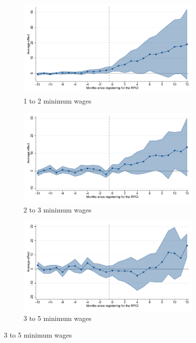 \begin{figure}[H]
    \begin{subfigure}{0.32\textwidth}
    \caption{1 to 2 minimum wages}
    \includegraphics[width=\textwidth]{04_Figures/muestra_10porciento/event_study_sal_formal_sal_min_1_2_dcdh_connected.pdf}
    \end{subfigure}
    \begin{subfigure}{0.32\textwidth}
    \caption{2 to 3 minimum wages}
    \includegraphics[width=\textwidth]{04_Figures/muestra_10porciento/event_study_sal_formal_sal_min_2_3_dcdh_connected.pdf}
    \end{subfigure}
    \begin{subfigure}{0.32\textwidth}
    \caption{3 to 5 minimum wages}
    \includegraphics[width=\textwidth]{04_Figures/muestra_10porciento/event_study_sal_formal_sal_min_3_5_dcdh_connected.pdf}
    \end{subfigure}


\end{figure}
